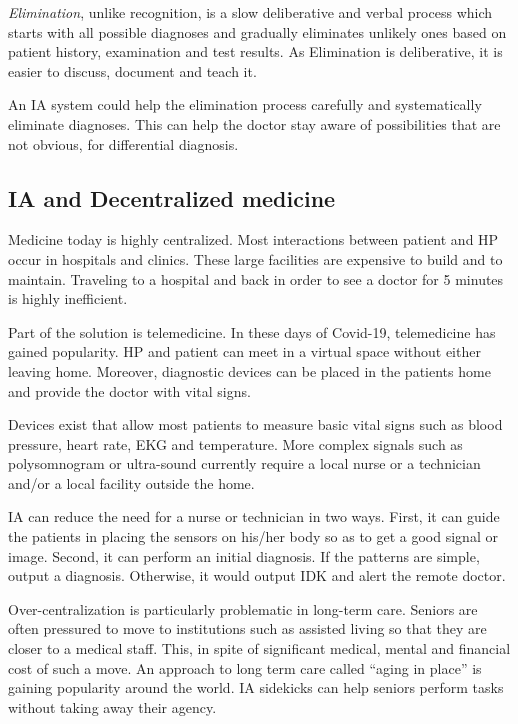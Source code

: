 \documentclass[11pt]{pnas-new}
\begin{document}
{\em Elimination}, unlike recognition, is a slow deliberative and
verbal process which starts with all possible diagnoses and gradually
eliminates unlikely ones based on patient history, examination and
test results. As Elimination is deliberative, it is easier to discuss,
document and teach it.

An IA system could help the elimination process carefully and
systematically eliminate diagnoses. This can help the doctor stay
aware of possibilities that are not obvious, for differential
diagnosis.


\subsection{IA and Decentralized medicine}

Medicine today is highly centralized. Most interactions
between patient and HP occur in hospitals and clinics. These
large facilities are expensive to build and to maintain. Traveling to
a hospital and back in order to see a doctor for 5 minutes is highly
inefficient. 

Part of the solution is telemedicine. In these days of Covid-19,
telemedicine has gained popularity. HP and patient can meet in a
virtual space without either leaving home. Moreover, diagnostic
devices can be placed in the patients home and provide the doctor with
vital signs.


Devices exist that allow most patients to measure basic vital signs
such as blood pressure, heart rate, EKG and temperature. More complex signals such as
polysomnogram or ultra-sound currently require a local nurse or a
technician and/or a local facility outside the home.

IA can reduce the need for a nurse or technician in two ways. First,
it can guide the patients in placing the sensors on his/her
body so as to get a good signal or image. Second, it can perform an
initial diagnosis. If the patterns are simple, output a diagnosis.
Otherwise, it would output IDK and alert the remote doctor.

Over-centralization is particularly problematic in long-term care.
Seniors are often pressured to move to institutions such as
assisted living so that they are closer to a medical staff. This, in
spite of significant medical, mental and financial cost of such a
move. An approach to long term care called ``aging in
place'' is gaining popularity around the world. IA sidekicks can help
seniors perform tasks without taking away their agency.
\end{document}
